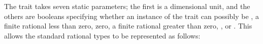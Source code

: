 The trait  takes seven static parameters; the first is a dimensional unit,
and the others are booleans specifying whether an instance of the trait can possibly
be \EXP{-\infty}, a finite rational less than zero, zero, a finite rational greater than zero,
\EXP{+\infty}, or .  This allows the standard rational types to be represented
as follows:
